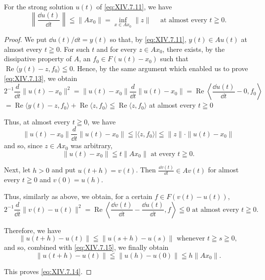 \begin{corollaryn} For the strong solution $u(t)$ of \eqref{eq:XIV.7.11}, we have
\begin{equation}\label{eq:XIV.7.14}
\left\| \frac {\dd u (t)}{\dd t} \right\| \leqq \| A x _{0} \| = \inf\limits _ {x \in A x _{0}} \| z \| \quad \text{ at almost every } t \geqq 0.
\end{equation}

\end{corollaryn}
\begin{proof}
 We put $\dd u(t) / \dd t = y(t)$ so that, by \eqref{eq:XIV.7.11}, $y(t) \in Au(t)$ at almost every $t \geqq 0$. For such $t$ and for every $z \in Ax_0$, there exists, by the dissipative property of $A$, an $f_0 \in F(u(t) - x_0)$ such that $\operatorname{Re}\langle y(t) - z, f_0 \rangle \leqq 0$. Hence, by the same argument which enabled us to prove \eqref{eq:XIV.7.13}, we obtain 
\[
2 ^{-1} \frac {d}{\dd t} \| u (t) - x _{0} \| ^{2} = \| u (t) - x _{0} \| \frac {d}{\dd t} \| u (t) - x _{0} \| = \operatorname{Re} \left\langle \frac {\dd u (t)}{\dd t} - 0, f _{0} \right\rangle
\]
$= \operatorname{Re}\langle y(t) - z,f_0\rangle +\operatorname{Re}\langle z,f_0\rangle \leqq \operatorname{Re}\langle z,f_0\rangle$ at almost every $t\geqq 0$ 

Thus, at almost every $t \geqq 0$, we have 
\[
\left\| u (t) - x _{0} \right\| \frac {d}{\dd t} \left\| u (t) - x _{0} \right\| \leqq | \langle z, f _{0} \rangle | \leqq \| z \| \cdot \| u (t) - x _{0} \|
\]
and so, since $z \in Ax_0$ was arbitrary, 
\begin{equation}\label{eq:XIV.7.15}
\left\| u (t) - x _{0} \right\| \leqq t \left\| A x _{0} \right\| \text{ at every } t \geqq 0.
\end{equation}

Next, let $h > 0$ and put $u(t + h) = v(t)$. Then 
$\frac{\dd v(t)}{\dd t} \in A v(t)$ for almost every $t \geqq 0$ and $v(0) = u(h)$. \label{eq:XIV.7.11'} 

Thus, similarly as above, we obtain, for a certain $f \in F(v(t) - u(t))$, 
\[
2 ^{-1} \frac {d}{\dd t} \| v (t) - u (t) \| ^{2} = \operatorname{Re} \left\langle \frac {\dd v (t)}{\dd t} - \frac {\dd u (t)}{\dd t}, f \right\rangle \leqq 0 \text{ at almost every } t \geqq 0.
\]

Therefore, we have 
\[
\left\| u (t + h) - u (t) \right\| \leqq \left\| u (s + h) - u (s) \right\| \text{ whenever } t \geqq s \geqq 0,
\]
and so, combined with \eqref{eq:XIV.7.15}, we finally obtain 
\begin{equation}\tag{15'}\label{eq:XIV.7.15'}
\left\| u (t + h) - u (t) \right\| \leqq \left\| u (h) - u (0) \right\| \leqq h \left\| A x _{0} \right\|.
\end{equation}

This proves \eqref{eq:XIV.7.14}. 
\end{proof}


